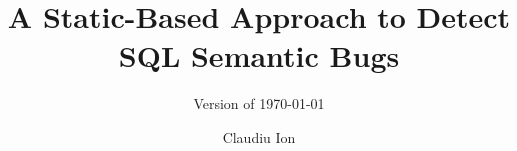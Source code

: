 \documentclass[twoside,a4paper,11pt]{memoir}
\title{A Static-Based Approach to Detect SQL Semantic Bugs}
\subtitle{Version of \today}
\author{Claudiu Ion}                               %
\begin{document}
\frontmatter
\thispagestyle{empty}
\maketitle                                          %
\makeformaltitlepages{}    %



\cleardoublepage\tableofcontents
\cleardoublepage\listoffigures
\cleardoublepage\mainmatter










\appendix
\def\chaptername{Appendix}


\end{document}
